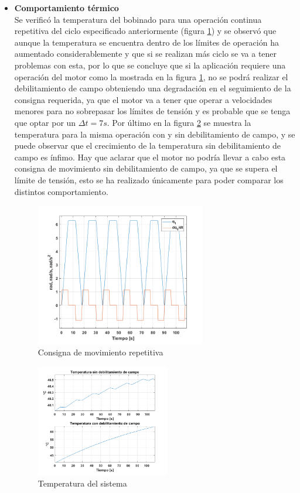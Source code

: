 \documentclass[10pt]{article}
\begin{document}
\begin{itemize}
\item \textbf{Comportamiento térmico}\\
Se verificó la temperatura del bobinado para una operación continua repetitiva del ciclo especificado anteriormente (figura \ref{fig:rep}) y se observó que aunque
la temperatura se encuentra dentro de los límites de operación ha aumentado considerablemente y que si se realizan más ciclo se va a tener problemas con esta, por lo que
se concluye que si la aplicación requiere una operación del motor como la mostrada en la figura \ref{fig:rep}, no se podrá realizar el debilitamiento de campo
 obteniendo una degradación en el seguimiento de la consigna requerida, ya que el motor va a tener que operar a velocidades menores para no sobrepasar los límites de tensión y es probable que se tenga que optar por un
 $\Delta t=7 s$. Por último en la figura \ref{fig:temp} se muestra la temperatura para la misma operación con y sin debilitamiento de campo, y se puede observar que el crecimiento de la temperatura
 sin debilitamiento de campo es ínfimo. Hay que aclarar que el motor no podría llevar a cabo esta consigna de movimiento sin debilitamiento de campo, ya que se supera el límite de tensión,
  esto se ha realizado únicamente para poder comparar los distintos comportamiento.
  \begin{figure}[h!]
	\centering
	\includegraphics[width=0.7\textwidth]{rep.png}
	\caption{\label{fig:rep}Consigna de movimiento repetitiva}
	\end{figure}
	\begin{figure}[h!]
		\centering
		\includegraphics[width=0.55\textwidth]{temp.png}
		\caption{\label{fig:temp}Temperatura del sistema}
		\end{figure}


\end{itemize}
\end{document}
